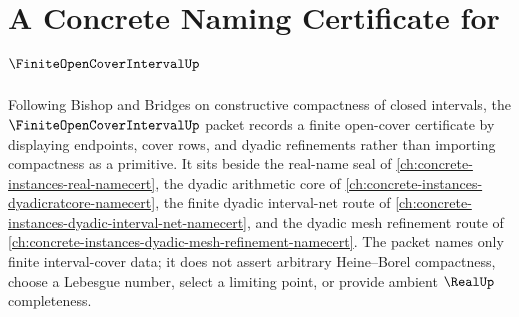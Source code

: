 \chapter{A Concrete Naming Certificate for $\FiniteOpenCoverIntervalUp$}
\label{ch:concrete-instances-finite-open-cover-interval-namecert}

Following Bishop and Bridges on constructive compactness of closed intervals, the $\FiniteOpenCoverIntervalUp$ packet records a finite open-cover certificate by displaying endpoints, cover rows, and dyadic refinements rather than importing compactness as a primitive. It sits beside the real-name seal of \autoref{ch:concrete-instances-real-namecert}, the dyadic arithmetic core of \autoref{ch:concrete-instances-dyadicratcore-namecert}, the finite dyadic interval-net route of \autoref{ch:concrete-instances-dyadic-interval-net-namecert}, and the dyadic mesh refinement route of \autoref{ch:concrete-instances-dyadic-mesh-refinement-namecert}. The packet names only finite interval-cover data; it does not assert arbitrary Heine--Borel compactness, choose a Lebesgue number, select a limiting point, or provide ambient $\RealUp$ completeness.


